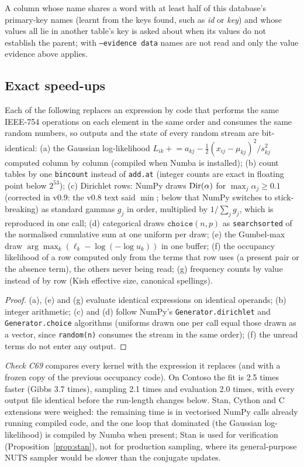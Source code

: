 \noindent A column whose name shares a word with at least half of this database's primary-key names (learnt from the keys found, such as \emph{id} or \emph{key}) and whose values all lie in another table's key is asked about when its values do not establish the parent; with \texttt{--evidence data} names are not read and only the value evidence above applies.

\subsection{Exact speed-ups}
\begin{proposition}\label{prop:kernels}
Each of the following replaces an expression by code that performs the same IEEE-754 operations on each element in the same order and consumes the same random numbers, so outputs and the state of every random stream are bit-identical: (a) the Gaussian log-likelihood $L_{ik}\mathrel{+}=a_{kj}-\frac12(x_{ij}-\mu_{kj})^2/s^2_{kj}$ computed column by column (compiled when Numba is installed); (b) count tables by one \texttt{bincount} instead of \texttt{add.at} (integer counts are exact in floating point below $2^{53}$); (c) Dirichlet rows: NumPy draws $\operatorname{Dir}(\alpha)$ for $\max_j\alpha_j\ge0.1$ (corrected in v0.9: the v0.8 text said $\min$; below that NumPy switches to stick-breaking) as standard gammas $g_j$ in order, multiplied by $1/\sum_jg_j$, which is reproduced in one call; (d) categorical draws $\texttt{choice}(n,p)$ as \texttt{searchsorted} of the normalised cumulative sum at one uniform per draw; (e) the Gumbel-max draw $\arg\max_k(\ell_k-\log(-\log u_k))$ in one buffer; (f) the occupancy likelihood of a row computed only from the terms that row uses (a present pair or the absence term), the others never being read; (g) frequency counts by value instead of by row (Kish effective size, canonical spellings).
\end{proposition}
\begin{proof}
(a), (e) and (g) evaluate identical expressions on identical operands; (b) integer arithmetic; (c) and (d) follow NumPy's \texttt{Generator.dirichlet} and \texttt{Generator.choice} algorithms (uniforms drawn one per call equal those drawn as a vector, since \texttt{random(n)} consumes the stream in the same order); (f) the unread terms do not enter any output.
\end{proof}
\noindent \emph{Check C69} compares every kernel with the expression it replaces (and with a frozen copy of the previous occupancy code). On Contoso the fit is 2.5 times faster (Gibbs 3.7 times), sampling 2.1 times and evaluation 2.0 times, with every output file identical before the run-length changes below. Stan, Cython and C extensions were weighed: the remaining time is in vectorised NumPy calls already running compiled code, and the one loop that dominated (the Gaussian log-likelihood) is compiled by Numba when present; Stan is used for verification (Proposition~\ref{prop:stan}), not for production sampling, where its general-purpose NUTS sampler would be slower than the conjugate updates.

